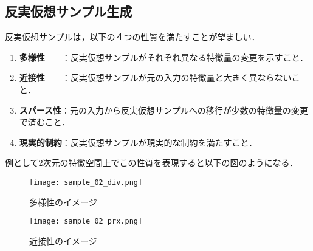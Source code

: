 \documentclass[dvipdfmx]{jreport}
\begin{document}
\subsection{反実仮想サンプル生成} \label{sec:counterfactual_generation}
反実仮想サンプルは，以下の４つの性質を満たすことが望ましい．

\begin{tcolorbox}[title=\textbf{反実仮想サンプルが満たすべき性質}]
    \begin{enumerate}
        \item \textbf{多様性}　　：反実仮想サンプルがそれぞれ異なる特徴量の変更を示すこと．
        \item \textbf{近接性}　　：反実仮想サンプルが元の入力の特徴量と大きく異ならないこと．
        \item \textbf{スパース性}：元の入力から反実仮想サンプルへの移行が少数の特徴量の変更で済むこと．
        \item \textbf{現実的制約}：反実仮想サンプルが現実的な制約を満たすこと．
    \end{enumerate}
\end{tcolorbox}

例として2次元の特徴空間上でこの性質を表現すると以下の図のようになる．


\begin{figure}[h]
    \centering
    \begin{minipage}[t]{0.49\columnwidth}
        \centering
        \texttt{[image: sample\_02\_div.png]}
        \caption{多様性のイメージ}\label{fig:div}
    \end{minipage}
    \centering
    \begin{minipage}[t]{0.49\columnwidth}
        \centering
        \texttt{[image: sample\_02\_prx.png]}
        \caption{近接性のイメージ}\label{fig:prx}
    \end{minipage}
\end{figure}
\end{document}
